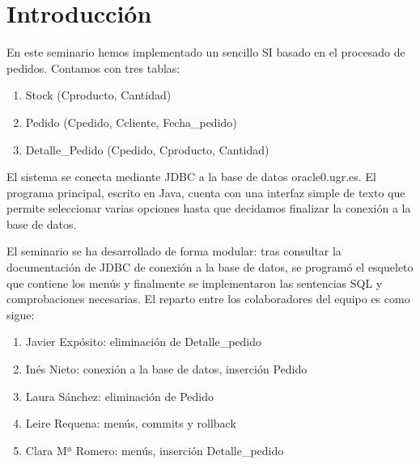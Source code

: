 \chapter{Introducción}

En este seminario hemos implementado un sencillo SI basado en el procesado de pedidos. Contamos con tres tablas:
\begin{enumerate}
	\item Stock (Cproducto, Cantidad) 
	\item Pedido (Cpedido, Ccliente, Fecha\_pedido)
	\item Detalle\_Pedido (Cpedido, Cproducto, Cantidad)
\end{enumerate}

El sistema se conecta mediante JDBC a la base de datos oracle0.ugr.es. El programa principal, escrito en Java, cuenta con una interfaz simple de texto que permite seleccionar varias opciones hasta que decidamos finalizar la conexión a la base de datos.

El seminario se ha desarrollado de forma modular: tras consultar la documentación de JDBC de conexión a la base de datos, se programó el esqueleto que contiene los menús y finalmente se implementaron las sentencias SQL y comprobaciones necesarias. El reparto entre los colaboradores del equipo es como sigue:
\begin{enumerate}
	\item Javier Expósito: eliminación de Detalle\_pedido 
	\item Inés Nieto: conexión a la base de datos, inserción Pedido
	\item Laura Sánchez: eliminación de Pedido
	\item Leire Requena: menús, commits y rollback
	\item Clara Mª Romero: menús, inserción Detalle\_pedido
\end{enumerate}
